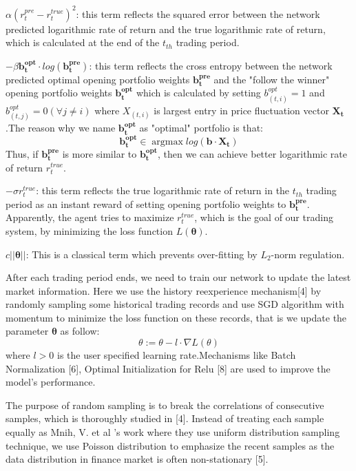 \documentclass{gapd}
\begin{document}
	$\alpha (r_t^{pre}-r_t^{true})^2$:
	this term reflects the squared error between the network predicted logarithmic rate of return and the true logarithmic rate of return, which is calculated at the end of the $t_{th}$ trading period.

	$- \beta \mathbf{b_t^{opt}}\cdot log(\mathbf{b_t^{pre}})$:
	this term reflects the cross entropy between the network predicted optimal opening portfolio weights $\mathbf{b_t^{pre}}$ and the "follow the winner" opening portfolio weights $\mathbf{b_t^{opt}}$ which is calculated by setting $b_{(t,i)}^{opt}=1$ and $b_{(t,j)}^{opt}=0(\forall j\not=i)$ where $X_{(t,i)}$ is largest entry in price fluctuation vector $\mathbf{X_t}$ .The reason why we name $\mathbf{b_t^{opt}}$ as "optimal" portfolio is that:
	$$\mathbf{b_t^{opt}}\in \mathop{\arg\max}log(\mathbf{b}\cdot \mathbf{X_t})$$
	Thus, if $\mathbf{b_t^{pre}}$ is more similar to $\mathbf{b_t^{opt}}$, then we can achieve better logarithmic rate of return $r_t^{true}$.

	$- \sigma r_t^{true}$:
	this term reflects the true logarithmic rate of return in the $t_{th}$ trading period as an instant reward of setting opening portfolio weights to $\mathbf{b_t^{pre}}$. Apparently, the agent tries to maximize $r_t^{true}$, which is the goal of our trading system, by minimizing the loss function $L(\boldsymbol{\theta})$.

	$c \vert \vert \boldsymbol{\theta} \vert \vert $:
	This is a classical term which prevents over-fitting by $L_2$-norm regulation.


After each trading period ends, we need to train our network to update the latest market information. Here we use the history reexperience mechanism[4] by randomly sampling some historical trading records and use SGD algorithm with momentum to minimize the loss function on these records, that is we update the parameter $\boldsymbol{\theta}$ as follow:
\begin{equation}
\theta:=\theta -l \cdot \nabla L(\theta)
\end{equation}
where $l>0$ is the user specified learning rate.Mechanisms like Batch Normalization [6], Optimal Initialization for Relu [8] are used to improve the model's performance.

The purpose of random sampling is to break the correlations of consecutive samples, which is thoroughly studied in [4]. Instead of treating each sample equally as Mnih, V. et al 's work where they use uniform distribution sampling technique, we use Poisson distribution to emphasize the recent samples as the data distribution in finance market is often non-stationary [5]. 
\end{document}
